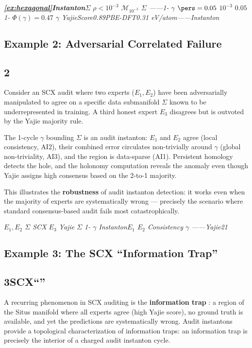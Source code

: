 \documentclass[11pt,a4paper]{article}
\theoremstyle{plain}
\theoremstyle{definition}
\newcommand{\cM}{\mathcal{M}}
\begin{document}
\bigskip
\noindent
\textit{\textbf{ \ref{ex:hexagonal}Instanton}$\Sigma$  $\rho < 10^{-3}$ $\cM_{10^{-3}}$  $\Sigma$ ——1- $\gamma$  $\pers = 0.05$ $10^{-3}$ $0.05$1- $\Phi(\gamma) = 0.47$ $\gamma$ YajieScore0.89PBE-DFT0.31 eV/atom——Instanton}

\subsection{Example 2: Adversarial Correlated Failure}
\subsection*{2}

Consider an SCX audit where two experts ($E_1, E_2$) have been adversarially 
manipulated to agree on a specific data submanifold $\Sigma$ known to be 
underrepresented in training. A third honest expert $E_3$ disagrees but 
is outvoted by the Yajie majority rule.

The 1-cycle $\gamma$ bounding $\Sigma$ is an audit instanton: $E_1$ and 
$E_2$ agree (local consistency, AI2), their combined error circulates 
non-trivially around $\gamma$ (global non-triviality, AI3), and the 
region is data-sparse (AI1). Persistent homology detects the hole, 
and the holonomy computation reveals the anomaly even though Yajie 
assigns high consensus based on the 2-to-1 majority.

This illustrates the \textbf{robustness} of audit instanton detection: 
it works even when the majority of experts are systematically wrong 
— precisely the scenario where standard consensus-based audit fails 
most catastrophically.

\bigskip
\noindent
\textit{$E_1, E_2$ $\Sigma$ SCX $E_3$ Yajie $\Sigma$ 1- $\gamma$ Instanton$E_1$  $E_2$ Consistency $\gamma$ ——Yajie21}

\subsection{Example 3: The SCX ``Information Trap''}
\subsection*{3SCX``''}

A recurring phenomenon in SCX auditing is the \textbf{information trap} 
\cite{scx_framework}: a region of the Situs manifold where all experts 
agree (high Yajie score), no ground truth is available, and yet the 
predictions are systematically wrong. Audit instantons provide a 
topological characterization of information traps: an information trap 
is precisely the interior of a charged audit instanton cycle.
\end{document}
